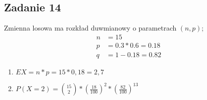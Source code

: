 \subsection{Zadanie 14}

Zmienna losowa ma rozkład duwmianowy o parametrach $(n,p)$;
\begin{align*}
n &= 15 \\
p &= 0.3*0.6 = 0.18 \\
q &= 1-0.18=0.82
\end{align*}

\begin{enumerate}
\item $EX=n*p=15*0,18=2,7$

\item $P(X=2)={{15}\choose{2}}*{(\frac{18}{100})}^{2}*{(\frac{82}{100})}^{13}$
\end{enumerate}